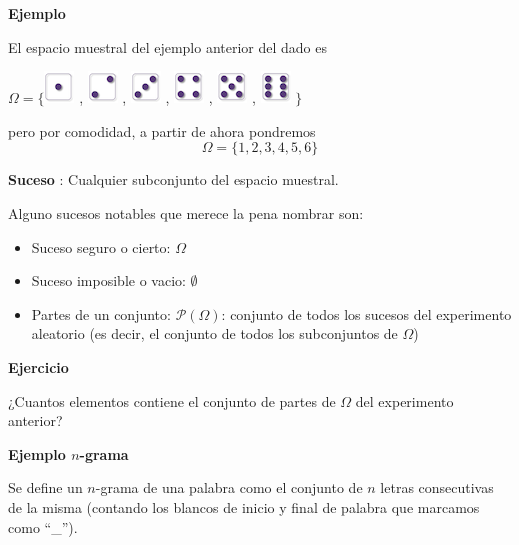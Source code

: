 \documentclass[]{book}
\providecommand{\tightlist}{%
  \setlength{\itemsep}{0pt}\setlength{\parskip}{0pt}}
\begin{document}
\textbf{Ejemplo}

El espacio muestral del ejemplo anterior del dado es

\(\Omega=\Big\{\)\includegraphics{Images/proba1dibujos/dice/1.png} ,
\includegraphics{Images/proba1dibujos/dice/2.png} ,
\includegraphics{Images/proba1dibujos/dice/3.png} ,
\includegraphics{Images/proba1dibujos/dice/4.png} ,
\includegraphics{Images/proba1dibujos/dice/5.png} ,
\includegraphics{Images/proba1dibujos/dice/6.png} \(\Big\}\)

pero por comodidad, a partir de ahora pondremos
\[\Omega = \{1,2,3,4,5,6\}\]

 \textbf{Suceso} : Cualquier subconjunto del espacio muestral.

Alguno sucesos notables que merece la pena nombrar son:

\begin{itemize}
\tightlist
\item
  Suceso seguro o cierto: \(\Omega\)
\item
  Suceso imposible o vacio: \(\emptyset\)
\item
  Partes de un conjunto: \(\mathcal{P}(\Omega)\): conjunto de todos los sucesos del experimento aleatorio (es decir, el conjunto de todos los subconjuntos de \(\Omega\))
\end{itemize}

\textbf{Ejercicio}

¿Cuantos elementos contiene el conjunto de partes de \(\Omega\) del experimento anterior?

\textbf{Ejemplo \(n\)-grama}

Se define un \(n\)-grama de una palabra como el conjunto de \(n\) letras consecutivas de la misma (contando los blancos de inicio y final de palabra que marcamos como ``\_'').
\end{document}
